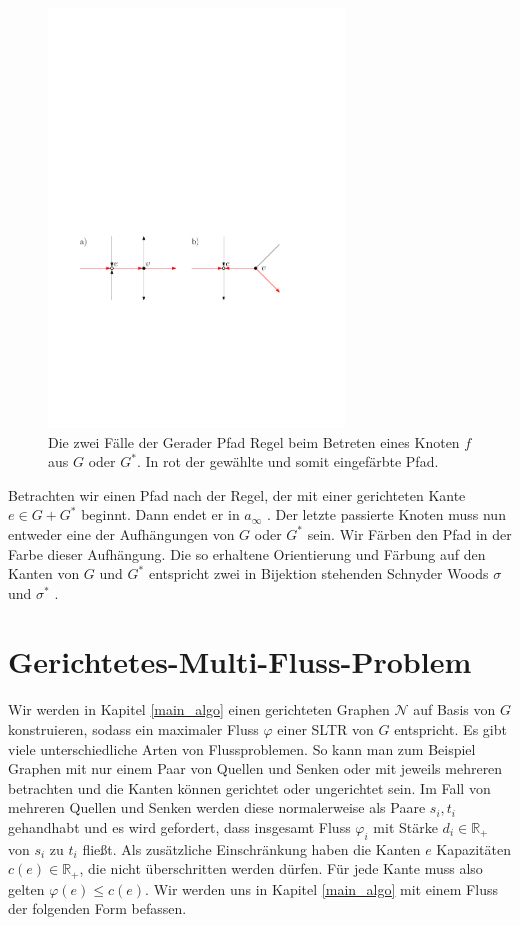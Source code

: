 \begin{figure}
	\centering
	\includegraphics[width=0.7\textwidth]{straight_path.pdf}
  \caption{Die zwei Fälle der Gerader Pfad Regel beim Betreten eines Knoten $f$ aus $G$ oder $G^*$. In rot der gewählte und somit eingefärbte Pfad.}
  \label{straight_path}
\end{figure}

Betrachten wir einen Pfad nach der Regel, der mit einer gerichteten Kante $e \in G+G^*$ beginnt. Dann endet er in $a_\infty$ \cite[Lemma 15]{felsner01}. Der letzte passierte Knoten muss nun entweder eine der Aufhängungen von $G$ oder $G^*$ sein. Wir Färben den Pfad in der Farbe dieser Aufhängung. Die so erhaltene Orientierung und Färbung auf den Kanten von $G$ und $G^*$ entspricht zwei in Bijektion stehenden Schnyder Woods $\sigma$ und $\sigma^*$ \cite{felsner04}.

\section{Gerichtetes-Multi-Fluss-Problem}\label{dir_multi_flow}

Wir werden in Kapitel \ref{main_algo} einen gerichteten Graphen $\mathcal{N}$ auf Basis von $G$ konstruieren, sodass ein maximaler Fluss $\varphi$ einer SLTR von $G$ entspricht. Es gibt viele unterschiedliche Arten von Flussproblemen. So kann man zum Beispiel Graphen mit nur einem Paar von Quellen und Senken oder mit jeweils mehreren betrachten und die Kanten können gerichtet oder ungerichtet sein. Im Fall von mehreren Quellen und Senken werden diese normalerweise als Paare $s_i,t_i$ gehandhabt und es wird gefordert, dass insgesamt Fluss $\varphi_i$ mit Stärke $d_i \in \mathbb{R}_+$ von $s_i$ zu $t_i$ fließt. Als zusätzliche Einschränkung haben die Kanten $e$ Kapazitäten $c(e) \in \mathbb{R}_+$, die nicht überschritten werden dürfen. Für jede Kante muss also gelten $\varphi(e) \leq c(e)$. Wir werden uns in Kapitel \ref{main_algo} mit einem Fluss der folgenden Form befassen.

